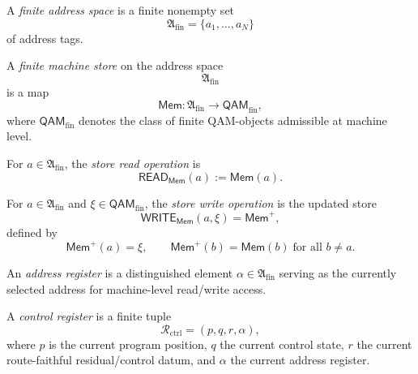 \begin{definition}\label{def:finite-address-space-computational-layer}
A \emph{finite address space} is a finite nonempty set
\[
\mathfrak{A}_{\mathrm{fin}}=\{a_1,\dots,a_N\}
\]
of address tags.
\end{definition}

\begin{definition}\label{def:finite-machine-store-as-address-map-computational-layer}
A \emph{finite machine store} on the address space
\[
\mathfrak{A}_{\mathrm{fin}}
\]
is a map
\[
\mathsf{Mem}:\mathfrak{A}_{\mathrm{fin}}\longrightarrow \mathsf{QAM}_{\mathrm{fin}},
\]
where \(\mathsf{QAM}_{\mathrm{fin}}\) denotes the class of finite QAM-objects admissible at machine level.
\end{definition}

\begin{definition}\label{def:store-read-operation-computational-layer}
For \(a\in\mathfrak{A}_{\mathrm{fin}}\), the \emph{store read operation} is
\[
\mathsf{READ}_{\mathsf{Mem}}(a):=\mathsf{Mem}(a).
\]
\end{definition}

\begin{definition}\label{def:store-write-operation-computational-layer}
For \(a\in\mathfrak{A}_{\mathrm{fin}}\) and \(\xi\in\mathsf{QAM}_{\mathrm{fin}}\), the \emph{store write operation} is the updated store
\[
\mathsf{WRITE}_{\mathsf{Mem}}(a,\xi)=\mathsf{Mem}^{+},
\]
defined by
\[
\mathsf{Mem}^{+}(a)=\xi,
\qquad
\mathsf{Mem}^{+}(b)=\mathsf{Mem}(b)
\;\text{for all } b\neq a.
\]
\end{definition}

\begin{definition}\label{def:address-register-computational-layer}
An \emph{address register} is a distinguished element \(\alpha\in\mathfrak{A}_{\mathrm{fin}}\) serving as the currently selected address for machine-level read/write access.
\end{definition}

\begin{definition}\label{def:control-register-computational-layer}
A \emph{control register} is a finite tuple
\[
\mathcal{R}_{\mathrm{ctrl}}=(p,q,r,\alpha),
\]
where \(p\) is the current program position, \(q\) the current control state, \(r\) the current route-faithful residual/control datum, and \(\alpha\) the current address register.
\end{definition}

